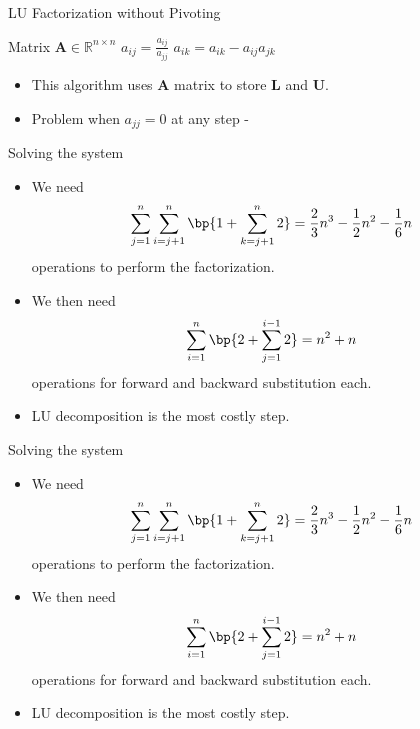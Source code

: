 \documentclass[11pt,xcolor={dvipsnames},aspectratio=159,hyperref={pdftex,pdfpagemode=UseNone,hidelinks,pdfdisplaydoctitle=true},usepdftitle=false]{beamer}
\begin{document}
\begin{frame}{LU Factorization without Pivoting}
    \begin{algorithm}[H]
        \scriptsize
        \caption{LU Factorization without Pivoting}
        \begin{algorithmic}[1]
            \Require Matrix $\mathbf{A} \in \mathbb{R}^{n \times n}$
                    \State $a_{ij} = \frac{a_{ij}}{a_{jj}}$
                        \State $a_{ik} = a_{ik} - a_{ij} a_{jk}$
                    \EndFor
                \EndFor
            \EndFor
        \end{algorithmic}
    \end{algorithm}
\begin{itemize} 
    \item This algorithm uses $\mathbf{A}$ matrix to store $\mathbf{L}$ and $\mathbf{U}$.
    \item Problem when $a_{jj} = 0$ at any step - 
\end{itemize}
\end{frame}
\begin{frame}{Solving the system}
   \begin{itemize}
   \item We need \begin{align*}
    \sum_{j=1}^n \sum_{i=j+1}^n \bp{1+\sum_{k=j+1}^n 2} = \frac{2}{3} n^3 - \frac{1}{2}n^2 - \frac{1}{6}n
   \end{align*}
    operations to perform the factorization.
    \item We then need \begin{align*}
        \sum_{i=1}^n \bp{2+\sum_{j=1}^{i-1} 2 } = n^2 + n
    \end{align*}
    operations for forward and backward substitution each. 
    \item LU decomposition is the most costly step. 
\end{itemize}
\end{frame}


\begin{frame}{Solving the system}
   \begin{itemize}
   \item We need \begin{align*}
    \sum_{j=1}^n \sum_{i=j+1}^n \bp{1+\sum_{k=j+1}^n 2} = \frac{2}{3} n^3 - \frac{1}{2}n^2 - \frac{1}{6}n
   \end{align*}
    operations to perform the factorization.
    \item We then need \begin{align*}
        \sum_{i=1}^n \bp{2+\sum_{j=1}^{i-1} 2 } = n^2 + n
    \end{align*}
    operations for forward and backward substitution each. 
    \item LU decomposition is the most costly step. 
\end{itemize}
\end{frame}
\end{document}
